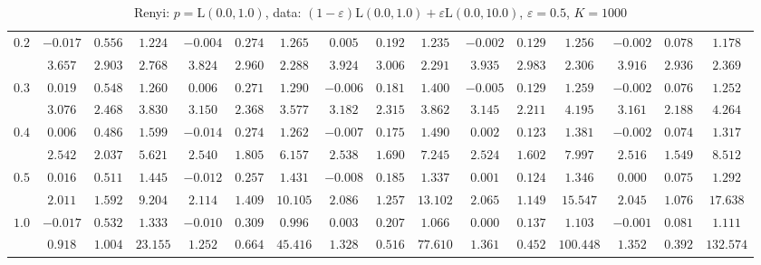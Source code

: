 \begin{table}[ht]
\begin{center}
\begin{tabular}{|c|ccc|ccc|ccc|ccc|ccc|}
\hline 
$0.2$ & $ -0.017 $ & $ 0.556 $ & $ 1.224 $ & $ -0.004 $ & $ 0.274 $ & $ 1.265 $ & $ 0.005 $ & $ 0.192 $ & $ 1.235 $ & $ -0.002 $ & $ 0.129 $ & $ 1.256 $ & $ -0.002 $ & $ 0.078 $ & $ 1.178 $\\ 
 & $ 3.657 $ & $ 2.903 $ & $ 2.768 $ & $ 3.824 $ & $ 2.960 $ & $ 2.288 $ & $ 3.924 $ & $ 3.006 $ & $ 2.291 $ & $ 3.935 $ & $ 2.983 $ & $ 2.306 $ & $ 3.916 $ & $ 2.936 $ & $ 2.369 $\\ 
\hline 
$0.3$ & $ 0.019 $ & $ 0.548 $ & $ 1.260 $ & $ 0.006 $ & $ 0.271 $ & $ 1.290 $ & $ -0.006 $ & $ 0.181 $ & $ 1.400 $ & $ -0.005 $ & $ 0.129 $ & $ 1.259 $ & $ -0.002 $ & $ 0.076 $ & $ 1.252 $\\ 
 & $ 3.076 $ & $ 2.468 $ & $ 3.830 $ & $ 3.150 $ & $ 2.368 $ & $ 3.577 $ & $ 3.182 $ & $ 2.315 $ & $ 3.862 $ & $ 3.145 $ & $ 2.211 $ & $ 4.195 $ & $ 3.161 $ & $ 2.188 $ & $ 4.264 $\\ 
\hline 
$0.4$ & $ 0.006 $ & $ 0.486 $ & $ 1.599 $ & $ -0.014 $ & $ 0.274 $ & $ 1.262 $ & $ -0.007 $ & $ 0.175 $ & $ 1.490 $ & $ 0.002 $ & $ 0.123 $ & $ 1.381 $ & $ -0.002 $ & $ 0.074 $ & $ 1.317 $\\ 
 & $ 2.542 $ & $ 2.037 $ & $ 5.621 $ & $ 2.540 $ & $ 1.805 $ & $ 6.157 $ & $ 2.538 $ & $ 1.690 $ & $ 7.245 $ & $ 2.524 $ & $ 1.602 $ & $ 7.997 $ & $ 2.516 $ & $ 1.549 $ & $ 8.512 $\\ 
\hline 
$0.5$ & $ 0.016 $ & $ 0.511 $ & $ 1.445 $ & $ -0.012 $ & $ 0.257 $ & $ 1.431 $ & $ -0.008 $ & $ 0.185 $ & $ 1.337 $ & $ 0.001 $ & $ 0.124 $ & $ 1.346 $ & $ 0.000 $ & $ 0.075 $ & $ 1.292 $\\ 
 & $ 2.011 $ & $ 1.592 $ & $ 9.204 $ & $ 2.114 $ & $ 1.409 $ & $ 10.105 $ & $ 2.086 $ & $ 1.257 $ & $ 13.102 $ & $ 2.065 $ & $ 1.149 $ & $ 15.547 $ & $ 2.045 $ & $ 1.076 $ & $ 17.638 $\\ 
\hline 
$1.0$ & $ -0.017 $ & $ 0.532 $ & $ 1.333 $ & $ -0.010 $ & $ 0.309 $ & $ 0.996 $ & $ 0.003 $ & $ 0.207 $ & $ 1.066 $ & $ 0.000 $ & $ 0.137 $ & $ 1.103 $ & $ -0.001 $ & $ 0.081 $ & $ 1.111 $\\ 
 & $ 0.918 $ & $ 1.004 $ & $ 23.155 $ & $ 1.252 $ & $ 0.664 $ & $ 45.416 $ & $ 1.328 $ & $ 0.516 $ & $ 77.610 $ & $ 1.361 $ & $ 0.452 $ & $ 100.448 $ & $ 1.352 $ & $ 0.392 $ & $ 132.574 $\\ 
\hline 
\end{tabular}
\caption{Renyi: $p = \mathrm{L}(0.0,1.0)$, data: $(1-\varepsilon)\mathrm{L}(0.0,1.0) + \varepsilon \mathrm{L}(0.0,10.0)$, $\varepsilon =  0.5$, $K = 1000$} 
\end{center}
\end{table}
%
